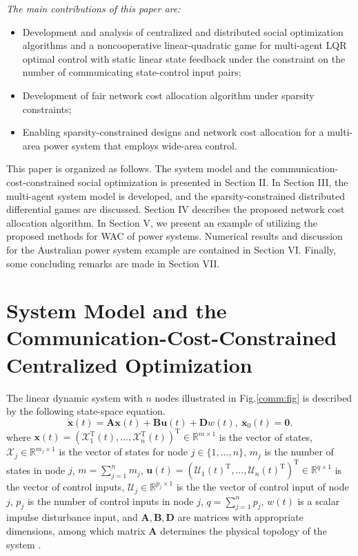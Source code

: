 \documentclass[12pt, draftclsnofoot,onecolumn]{IEEEtran}
\begin{document}
{\it The main contributions of this paper are:}
\begin{itemize}
\item Development and analysis of centralized and distributed social optimization algorithms and a noncooperative linear-quadratic game for multi-agent LQR optimal control with static linear state feedback under the constraint on the number of communicating state-control input pairs;
\item Development of fair network cost allocation algorithm under sparsity constraints;
\item Enabling sparsity-constrained designs and network cost allocation for a multi-area power system that employs wide-area control.
\end{itemize}


This paper is organized as follows. The system model and the communication-cost-constrained social optimization is presented in Section II. In Section III, the multi-agent system model is developed, and the sparsity-constrained distributed differential games are discussed. Section IV describes the proposed network cost allocation algorithm. In Section V, we present an example of utilizing the proposed methods for WAC of power systems. Numerical results and discussion for the Australian power system example are contained in Section VI. Finally, some concluding remarks are made in Section VII.  




\section{System Model and the Communication-Cost-Constrained Centralized Optimization}
\label{cent_sparse:sec}

The linear dynamic system with $n$ nodes illustrated in Fig.\ref{comm:fig} is described by the following state-space equation. 
\begin{equation}
	\dot{\boldsymbol x}(t)={\boldsymbol A}{\boldsymbol x}(t)+{\boldsymbol B}{\boldsymbol u}(t) + {\boldsymbol D}{w}(t),~ \boldsymbol x_0(t) = \boldsymbol 0.
	\label{short:eq}
\end{equation}
\noindent where ${\boldsymbol x}(t){=}({\mathcal X}_1^{\mathrm{T}}(t),...,{\mathcal X}_n^{\mathrm{T}}(t))^{\mathrm{T}}{\in} \mathbb{R}^{m\times 1}$ is the vector of states, $\mathcal{X}_j {\in} \mathbb{R}^{m_j\times 1}$ is the vector of states for node $j{\in}\{1,...,n\}$, $m_j$ is the number of states in node $j$, $m=\sum_{j=1}^n{m_j}$, ${\boldsymbol u}(t)=(\mathcal U_1(t)^{\mathrm{T}},...,\mathcal U_n(t)^{\mathrm{T}})^{\mathrm{T}}\in \mathbb{R}^{q\times 1}$ is the vector of control inputs, $\mathcal{U}_j \in \mathbb{R}^{p_j\times 1}$ is the the vector of control input of node $j$, $p_j$ is the number of control inputs in node $j$, $q=\sum_{j=1}^{n}{p_j}$, $w(t)$ is a scalar impulse disturbance input, and $\boldsymbol A,\boldsymbol B,\boldsymbol D$ are matrices with appropriate dimensions, among which matrix $\boldsymbol{A}$ determines the physical topology of the system \cite{lewis1995optimal}.
\end{document}
